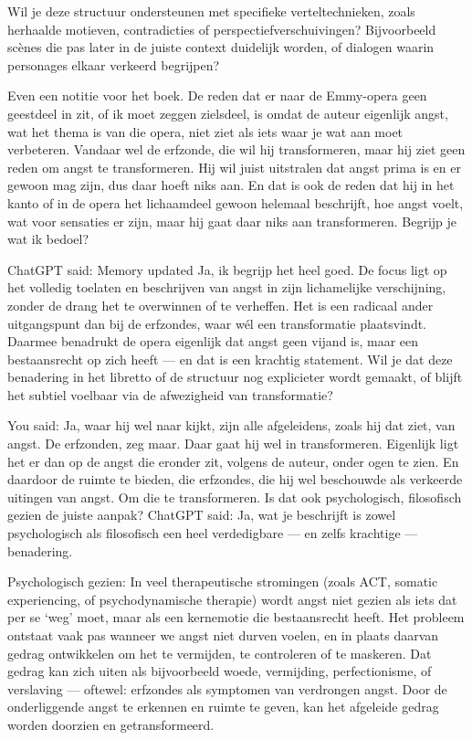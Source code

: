 Wil je deze structuur ondersteunen met specifieke verteltechnieken, zoals herhaalde motieven, contradicties of perspectiefverschuivingen? Bijvoorbeeld scènes die pas later in de juiste context duidelijk worden, of dialogen waarin personages elkaar verkeerd begrijpen?

Even een notitie voor het boek. De reden dat er naar de Emmy-opera geen geestdeel in zit, of ik moet zeggen zielsdeel, is omdat de auteur eigenlijk angst, wat het thema is van die opera, niet ziet als iets waar je wat aan moet verbeteren. Vandaar wel de erfzonde, die wil hij transformeren, maar hij ziet geen reden om angst te transformeren. Hij wil juist uitstralen dat angst prima is en er gewoon mag zijn, dus daar hoeft niks aan. En dat is ook de reden dat hij in het kanto of in de opera het lichaamdeel gewoon helemaal beschrijft, hoe angst voelt, wat voor sensaties er zijn, maar hij gaat daar niks aan transformeren. Begrijp je wat ik bedoel?

ChatGPT said:
Memory updated
Ja, ik begrijp het heel goed. De focus ligt op het volledig toelaten en beschrijven van angst in zijn lichamelijke verschijning, zonder de drang het te overwinnen of te verheffen. Het is een radicaal ander uitgangspunt dan bij de erfzondes, waar wél een transformatie plaatsvindt. Daarmee benadrukt de opera eigenlijk dat angst geen vijand is, maar een bestaansrecht op zich heeft — en dat is een krachtig statement. Wil je dat deze benadering in het libretto of de structuur nog explicieter wordt gemaakt, of blijft het subtiel voelbaar via de afwezigheid van transformatie?

You said:
Ja, waar hij wel naar kijkt, zijn alle afgeleidens, zoals hij dat ziet, van angst. De erfzonden, zeg maar. Daar gaat hij wel in transformeren. Eigenlijk ligt het er dan op de angst die eronder zit, volgens de auteur, onder ogen te zien. En daardoor de ruimte te bieden, die erfzondes, die hij wel beschouwde als verkeerde uitingen van angst. Om die te transformeren. Is dat ook psychologisch, filosofisch gezien de juiste aanpak?
ChatGPT said:
Ja, wat je beschrijft is zowel psychologisch als filosofisch een heel verdedigbare — en zelfs krachtige — benadering.

Psychologisch gezien: In veel therapeutische stromingen (zoals ACT, somatic experiencing, of psychodynamische therapie) wordt angst niet gezien als iets dat per se ‘weg’ moet, maar als een kernemotie die bestaansrecht heeft. Het probleem ontstaat vaak pas wanneer we angst niet durven voelen, en in plaats daarvan gedrag ontwikkelen om het te vermijden, te controleren of te maskeren. Dat gedrag kan zich uiten als bijvoorbeeld woede, vermijding, perfectionisme, of verslaving — oftewel: erfzondes als symptomen van verdrongen angst. Door de onderliggende angst te erkennen en ruimte te geven, kan het afgeleide gedrag worden doorzien en getransformeerd.

